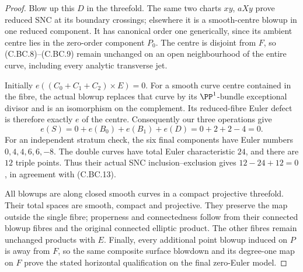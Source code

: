 \begin{proof}
Blow up this \(D\) in the threefold. The same two
charts \(xy\), \(aXy\) prove reduced SNC at its
boundary crossings; elsewhere it is a smooth-centre
blowup in one reduced component. It has canonical
order one generically, since its ambient centre lies
in the zero-order component \(P_0\). The centre is
disjoint from \(F\), so (C.BC.8)--(C.BC.9) remain
unchanged on an open neighbourhood of the entire
curve, including every analytic transverse jet.

Initially \(e((C_0+C_1+C_2)\times E)=0\).
For a smooth curve centre contained in the fibre,
the actual blowup replaces that curve by its
\(\PP^1\)-bundle exceptional divisor and is an
isomorphism on the complement. Its reduced-fibre
Euler defect is therefore exactly \(e\) of the
centre. Consequently our three operations give
\[
             e(S)=0+e(B_0)+e(B_1)+e(D)
                         =0+2+2-4=0 .                       \tag{C.BC.13}
\]
For an independent stratum check, the six final components
have Euler numbers \(0,4,4,6,6,-8\). The double curves
have total Euler characteristic \(24\), and there are
\(12\) triple points. Thus their actual SNC
inclusion--exclusion gives \(12-24+12=0\), in
agreement with (C.BC.13).

All blowups are along closed smooth curves in a
compact projective threefold. Their total spaces
are smooth, compact and projective. They preserve
the map outside the single fibre; properness and
connectedness follow from their connected blowup
fibres and the original connected elliptic product.
The other fibres remain unchanged products with
\(E\). Finally, every additional point blowup
induced on \(P\) is away from \(F\), so the
same composite surface blowdown and its degree-one
map on \(F\) prove the stated horizontal
qualification on the final zero-Euler model.
\end{proof}
